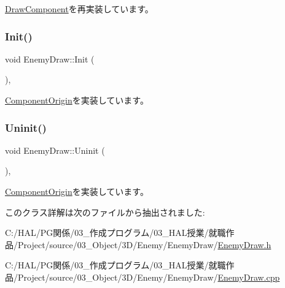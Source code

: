 \mbox{\hyperlink{class_draw_component_a5f3bbcc8e563b740c0a5535170921c75}{Draw\+Component}}を再実装しています。

\mbox{\label{class_enemy_draw_aa1659c35fa757db6a6cf07e26ad9ddfb}} 
\subsubsection{\texorpdfstring{Init()}{Init()}}
{\footnotesize\ttfamily void Enemy\+Draw\+::\+Init (\begin{DoxyParamCaption}{ }\end{DoxyParamCaption})\hspace{0.3cm}{\ttfamily [override]}, {\ttfamily [virtual]}}



\mbox{\hyperlink{class_component_origin_a9f674891257f2272b1636d8b6bb05d81}{Component\+Origin}}を実装しています。

\mbox{\label{class_enemy_draw_a2861dc0623b0be7726bc69a6a469190e}} 
\subsubsection{\texorpdfstring{Uninit()}{Uninit()}}
{\footnotesize\ttfamily void Enemy\+Draw\+::\+Uninit (\begin{DoxyParamCaption}{ }\end{DoxyParamCaption})\hspace{0.3cm}{\ttfamily [override]}, {\ttfamily [virtual]}}



\mbox{\hyperlink{class_component_origin_a9f89a93f9c1954bd53f9750e35e6089d}{Component\+Origin}}を実装しています。



このクラス詳解は次のファイルから抽出されました\+:\begin{DoxyCompactItemize}
\item 
C\+:/\+H\+A\+L/\+P\+G関係/03\+\_\+作成プログラム/03\+\_\+\+H\+A\+L授業/就職作品/\+Project/source/03\+\_\+\+Object/3\+D/\+Enemy/\+Enemy\+Draw/\mbox{\hyperlink{_enemy_draw_8h}{Enemy\+Draw.\+h}}\item 
C\+:/\+H\+A\+L/\+P\+G関係/03\+\_\+作成プログラム/03\+\_\+\+H\+A\+L授業/就職作品/\+Project/source/03\+\_\+\+Object/3\+D/\+Enemy/\+Enemy\+Draw/\mbox{\hyperlink{_enemy_draw_8cpp}{Enemy\+Draw.\+cpp}}\end{DoxyCompactItemize}
